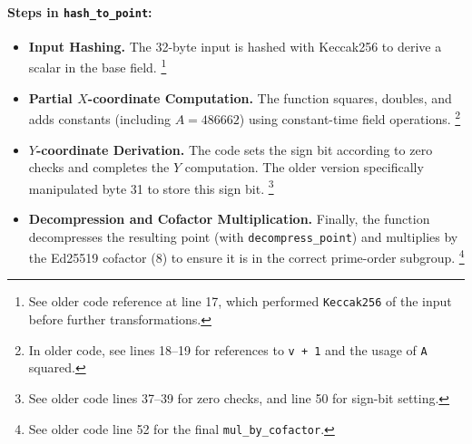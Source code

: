 \documentclass[12pt,a4paper]{article}
\begin{document}
\paragraph{Steps in \texttt{hash\_to\_point}:}
\begin{itemize}
    \item \textbf{Input Hashing.} The 32-byte input is hashed with Keccak256 to derive a scalar in the base field.%
    \footnote{See older code reference at line 17, which performed \texttt{Keccak256} of the input before further transformations.} 
    
    \item \textbf{Partial $X$-coordinate Computation.} The function squares, doubles, and adds constants (including $A = 486662$) using constant-time field operations.%
    \footnote{In older code, see lines 18--19 for references to \texttt{v + 1} and the usage of \texttt{A} squared.}
    
    \item \textbf{$Y$-coordinate Derivation.} The code sets the sign bit according to zero checks and completes the $Y$ computation. The older version specifically manipulated byte 31 to store this sign bit.%
    \footnote{See older code lines 37--39 for zero checks, and line 50 for sign-bit setting.}

    \item \textbf{Decompression and Cofactor Multiplication.} Finally, the function decompresses the resulting point (with \texttt{decompress\_point}) and multiplies by the Ed25519 cofactor (8) to ensure it is in the correct prime-order subgroup.%
    \footnote{See older code line 52 for the final \texttt{mul\_by\_cofactor}.}
\end{itemize}
\end{document}

